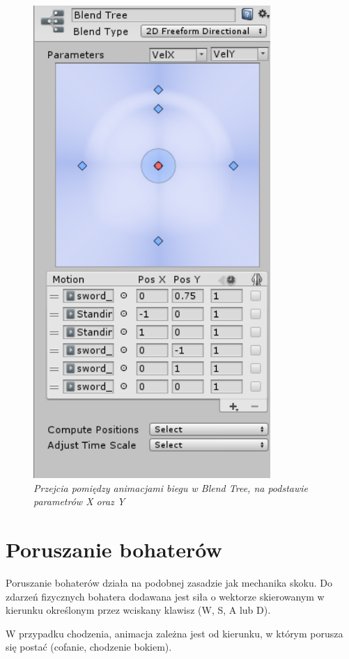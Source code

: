 \documentclass[openright]{xmgr}
\begin{document}
    \begin{figure}[H]
        \center
        \includegraphics[width=9cm]{blendtree_2.png}
        \caption{ \textit{Przejcia pomiędzy animacjami biegu w Blend Tree, na podstawie parametrów X oraz Y}}
        \end{figure}

  \section{Poruszanie bohaterów}

      Poruszanie bohaterów działa na podobnej zasadzie jak mechanika skoku. Do zdarzeń fizycznych bohatera dodawana jest siła o wektorze skierowanym w kierunku określonym przez wciskany klawisz (W, S, A lub D).

      W przypadku chodzenia, animacja zależna jest od kierunku, w którym porusza się postać (cofanie, chodzenie bokiem).
\end{document}
